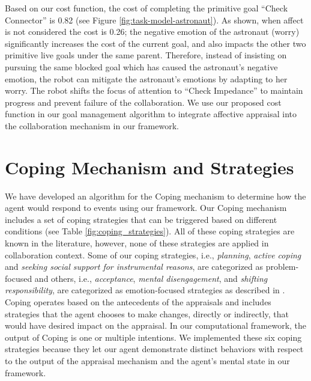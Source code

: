 \documentclass[12pt]{report}
\begin{document}
Based on our cost function, the cost of completing the primitive goal ``Check
Connector'' is 0.82 (see Figure \ref{fig:task-model-astronaut}). As shown, when
affect is not considered the cost is 0.26; the negative emotion of the astronaut
(worry) significantly increases the cost of the current goal, and also impacts
the other two primitive live goals under the same parent. Therefore, instead of
insisting on pursuing the same blocked goal which has caused the astronaut's
negative emotion, the robot can mitigate the astronaut's emotions by adapting to
her worry. The robot shifts the focus of attention to ``Check Impedance'' to
maintain progress and prevent failure of the collaboration. We use our proposed
cost function in our goal management algorithm to integrate affective appraisal
into the collaboration mechanism in our framework.

\section{Coping Mechanism and Strategies}
\label{sec:coping-mechanism}
We have developed an algorithm for the Coping mechanism to determine how the
agent would respond to events using our framework. Our Coping mechanism includes
a set of coping strategies that can be triggered based on different conditions
(see Table \ref{fig:coping_strategies}). All of these coping strategies are
known in the literature, however, none of these strategies are applied in
collaboration context. Some of our coping strategies, i.e., \textit{planning},
\textit{active coping} and \textit{seeking social support for instrumental
reasons}, are categorized as problem-focused and others, i.e.,
\textit{acceptance}, \textit{mental disengagement}, and \textit{shifting
responsibility}, are categorized as emotion-focused strategies as described in
\cite{gratch:domain-independent}. {\color{red}Coping operates based on the
antecedents of the appraisals and includes strategies that the agent chooses to make changes,
directly or indirectly, that would have desired impact on the appraisal. In
our computational framework, the output of Coping is one or multiple
intentions.} We implemented these six coping strategies because they let our
agent demonstrate distinct behaviors with respect to the output of the appraisal
mechanism and the agent's mental state in our framework.
\end{document}
